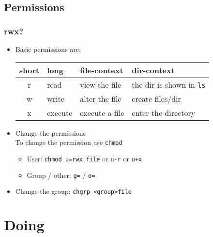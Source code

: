 \documentclass[hyperref={pdfpagelabels=false}]{beamer}
\newcommand{\code}[1]{\colorbox{lGray}{\texttt{#1}}}
\begin{document}
    \subsection{Permissions}
        \begin{frame}
			\frametitle{rwx?}
			\begin{itemize}
                \item<1-> Basic permissions are: \\
                \begin{tabular}{clll}
                    short & long & file-context & dir-context \\ \hline
                    r & read & view the file & the dir is shown in \code{ls} \\
                    w & write & alter the file & create files/dir \\
                    x & execute & execute a file & enter the directory
                \end{tabular}
                \item<2-> Change the permissions \\
                To change the permission use \code{chmod}
                \begin{itemize}
                    \item<3-> User: \code{chmod u=rwx file} or \code{u-r} or \code{u+x}
                    \item<4-> Group / other: \code{g=} / \code{o=}
                \end{itemize}
                \item<5-> Change the group: \code{chgrp \textless group\textgreater file}
            \end{itemize}
		\end{frame}
\section{Doing}
\end{document}
